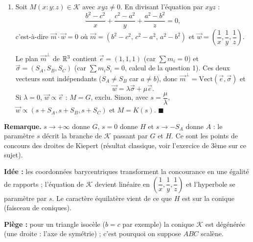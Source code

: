\begin{enumerate}[itemsep=14pt]
  Reste à voir que $\mathcal K$ est une vraie conique non dégénérée. La matrice de la forme $Q(x,y,z)=(b^2-c^2)yz+\cdots$ a pour déterminant $\dfrac14(b^2-c^2)(c^2-a^2)(a^2-b^2)\neq0$ car le triangle est scalène.

  Comme $\alpha+\gamma=0$, le discriminant de la partie quadratique est $\beta^2-\alpha\gamma=\alpha^2+\beta^2$. Il ne peut pas être nul (sinon $\alpha=\beta=\gamma=0$ et l'équation serait celle d'une droite, qui ne peut contenir $A$, $B$, $C$). Donc $\alpha^2+\beta^2>0$ : \textbf{$\mathcal K$ est une hyperbole, à asymptotes perpendiculaires}.

  \item Soit $M(x:y:z)\in\mathcal K$ avec $xyz\neq0$. En divisant l'équation par $xyz$ :
  \[\dfrac{b^2-c^2}{x}+\dfrac{c^2-a^2}{y}+\dfrac{a^2-b^2}{z}=0,\]
  c'est-à-dire $\overrightarrow{m}\cdot\overrightarrow{w}=0$ où $\overrightarrow{m}=(b^2-c^2,\,c^2-a^2,\,a^2-b^2)$ et $\overrightarrow{w}=\left(\dfrac1x,\dfrac1y,\dfrac1z\right)$.

  Le plan $\overrightarrow{m}^{\perp}$ de $\mathbb{R}^3$ contient $\overrightarrow{e}=(1,1,1)$ (car $\sum m_i=0$) et $\overrightarrow{\sigma}=(S_A,S_B,S_C)$ (car $\sum m_iS_i=0$, calcul de la question 1). Ces deux vecteurs sont indépendants ($S_A\neq S_B$ car $a\neq b$), donc $\overrightarrow{m}^\perp=\text{Vect}(\overrightarrow{e},\overrightarrow{\sigma})$ et
  \[\overrightarrow{w}=\lambda\overrightarrow{\sigma}+\mu\overrightarrow{e}.\]
  Si $\lambda=0$, $\overrightarrow{w}\propto\overrightarrow{e}$ : $M=G$, exclu. Sinon, avec $s=\dfrac\mu\lambda$, $\overrightarrow{w}\propto(s+S_A,s+S_B,s+S_C)$ et $M=K(s)$. $\blacksquare$
\end{enumerate}

\textbf{Remarque.} $s\to+\infty$ donne $G$, $s=0$ donne $H$ et $s\to-S_A$ donne $A$ : le paramètre $s$ décrit la branche de $\mathcal K$ passant par $G$ et $H$. Ce sont les points de concours des droites de Kiepert (résultat classique, voir l'exercice de 3ème sur ce sujet).

\textbf{Idée :} les coordonnées barycentriques transforment la concourance en une égalité de rapports ; l'équation de $\mathcal K$ devient linéaire en $\left(\dfrac1x,\dfrac1y,\dfrac1z\right)$ et l'hyperbole se paramètre par $s$. Le caractère équilatère vient de ce que $H$ est sur la conique (faisceau de coniques).

\textbf{Piège :} pour un triangle isocèle ($b=c$ par exemple) la conique $\mathcal K$ est dégénérée (une droite : l'axe de symétrie) ; c'est pourquoi on suppose $ABC$ scalène.
